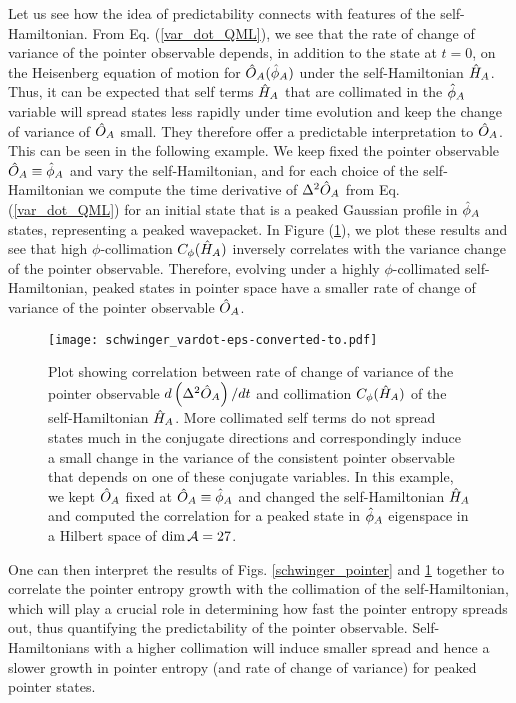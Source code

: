 \documentclass[aps,pra,onecolumn,nofootinbib,11pt,tightenlines]{revtex4-1}
\begin{document}
 Let us see how the idea of predictability connects with features of the self-Hamiltonian. From Eq. (\ref{var_dot_QML}), we see that the rate of change of variance of the pointer observable depends, in addition to the state at $t = 0$, on the Heisenberg equation of motion for $\hat{O}_{A}(\hat{\phi}_{A})$ under the self-Hamiltonian $\hat{H}_{A}$. Thus, it can be expected that self terms $\hat{H}_{A}$ that are collimated in the $\hat{\phi}_{A}$ variable will spread states less rapidly under time evolution and keep the change of variance of $\hat{O}_{A}$ small. They therefore offer a predictable interpretation to $\hat{O}_{A}$. This can be seen in the following example. We keep fixed the pointer observable $\hat{O}_{A} \equiv \hat{\phi}_{A}$ and vary the self-Hamiltonian, and for each choice of the self-Hamiltonian we compute the time derivative of $\Delta^2 \hat{O}_{A}$ from Eq. (\ref{var_dot_QML}) for an initial state that is a peaked Gaussian profile in $\hat{\phi}_{A}$ states, representing a peaked wavepacket.  In Figure (\ref{schwinger_vardot}), we plot these results and see that high $\phi$-collimation $C_{\phi}(\hat{H}_{A})$ inversely correlates with the variance change of the pointer observable. Therefore, evolving under a highly $\phi$-collimated self-Hamiltonian, peaked states in pointer space have a smaller rate of change of variance of the pointer observable $\hat{O}_{A}$.
 
\begin{figure}[h]
\texttt{[image: schwinger\_vardot-eps-converted-to.pdf]}
\caption{Plot showing correlation between rate of change of variance of the pointer observable $d \left(\Delta^{2} \hat{O}_{A}\right)/dt$ and collimation $C_{\phi}(\hat{H}_{A})$ of the self-Hamiltonian $\hat{H}_{A}$. More collimated self terms do not spread states much in the conjugate directions and correspondingly induce a small change in the variance of the consistent pointer observable that depends on one of these conjugate variables. In this example, we kept $\hat{O}_{A}$ fixed at $\hat{O}_{A} \equiv \hat{\phi}_{A}$ and changed the self-Hamiltonian $\hat{H}_{A}$ and computed the correlation for a peaked state in $\hat{\phi}_{A}$ eigenspace in a Hilbert space of $\textrm{dim\,} \mathcal{A} = 27$.}
\label{schwinger_vardot}
\end{figure}

One can then interpret the results of Figs. \ref{schwinger_pointer} and \ref{schwinger_vardot} together to correlate the pointer entropy growth with the collimation of the self-Hamiltonian, which will play a crucial role in determining how fast the pointer entropy spreads out, thus quantifying the predictability of the pointer observable. Self-Hamiltonians with a higher collimation will induce smaller spread and hence a slower growth in pointer entropy (and rate of change of variance) for peaked pointer states.
\end{document}
